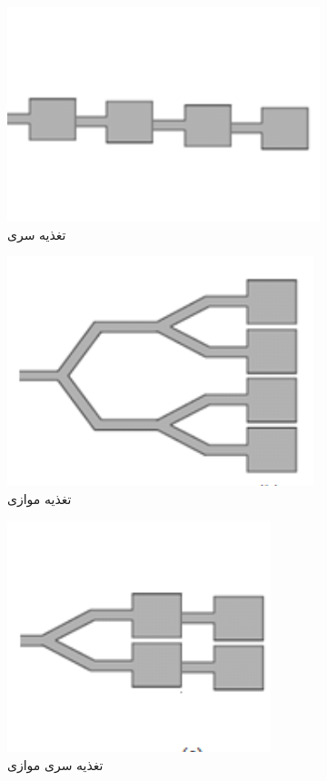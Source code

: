 \begin{figure}[t]
	\centering
	\begin{subfigure}{0.3\textwidth} %
		\includegraphics[scale=0.2]{Images/fig12.png}
		\caption{تغذیه سری} %
		\label{fig12}
	\end{subfigure}
	\vspace{1em} %
	\begin{subfigure}{0.3\textwidth} %
		\includegraphics[scale=0.2]{Images/fig13.png}
		\caption{تغذیه موازی} %
		\label{fig13}
	\end{subfigure}
		\vspace{1em} %
	\begin{subfigure}{0.3\textwidth} %
		\includegraphics[scale=0.2]{Images/fig14.png}
		\caption{تغذیه سری موازی} %
		\label{fig14}
	\end{subfigure}
	\caption{}
\end{figure}


